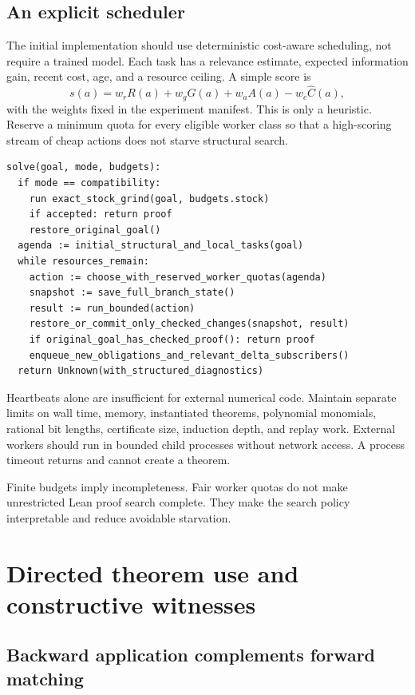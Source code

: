 \subsection{An explicit scheduler}

The initial implementation should use deterministic cost-aware scheduling, not require a trained model. Each task has a relevance estimate, expected information gain, recent cost, age, and a resource ceiling. A simple score is
\[
  s(a)=w_r R(a)+w_g G(a)+w_a A(a)-w_c\widehat C(a),
\]
with the weights fixed in the experiment manifest. This is only a heuristic. Reserve a minimum quota for every eligible worker class so that a high-scoring stream of cheap actions does not starve structural search.

\begin{lstlisting}
solve(goal, mode, budgets):
  if mode == compatibility:
    run exact_stock_grind(goal, budgets.stock)
    if accepted: return proof
    restore_original_goal()
  agenda := initial_structural_and_local_tasks(goal)
  while resources_remain:
    action := choose_with_reserved_worker_quotas(agenda)
    snapshot := save_full_branch_state()
    result := run_bounded(action)
    restore_or_commit_only_checked_changes(snapshot, result)
    if original_goal_has_checked_proof(): return proof
    enqueue_new_obligations_and_relevant_delta_subscribers()
  return Unknown(with_structured_diagnostics)
\end{lstlisting}

Heartbeats alone are insufficient for external numerical code. Maintain separate limits on wall time, memory, instantiated theorems, polynomial monomials, rational bit lengths, certificate size, induction depth, and replay work. External workers should run in bounded child processes without network access. A process timeout returns \unknown{} and cannot create a theorem.

Finite budgets imply incompleteness. Fair worker quotas do not make unrestricted Lean proof search complete. They make the search policy interpretable and reduce avoidable starvation.

\section{Directed theorem use and constructive witnesses}

\subsection{Backward application complements forward matching}

